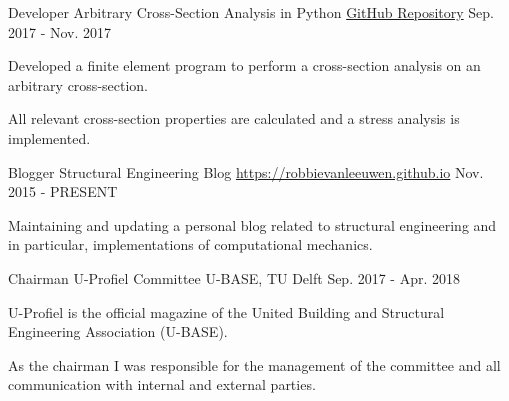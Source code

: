 

\begin{cventries}

  \cventry
    {Developer} %
    {Arbitrary Cross-Section Analysis in Python} %
    {\href{https://github.com/robbievanleeuwen/section-properties}{GitHub Repository}} %
    {Sep. 2017 - Nov. 2017} %
    {
      \begin{cvitems} %
        \item {Developed a finite element program to perform a cross-section analysis on an arbitrary cross-section.}
        \item {All relevant cross-section properties are calculated and a stress analysis is implemented.}
      \end{cvitems}
    }
 
  \cventry
    {Blogger} %
    {Structural Engineering Blog} %
    {\href{https://robbievanleeuwen.github.io}{https://robbievanleeuwen.github.io}} %
    {Nov. 2015 - PRESENT} %
    {
      \begin{cvitems} %
        \item {Maintaining and updating a personal blog related to structural engineering and in particular, implementations of computational mechanics.}
      \end{cvitems}
    }
    
     \cventry
    {Chairman} %
    {U-Profiel Committee} %
    {U-BASE, TU Delft} %
    {Sep. 2017 - Apr. 2018} %
    {
      \begin{cvitems} %
        \item {U-Profiel is the official magazine of the United Building and Structural Engineering Association (U-BASE).}
        \item {As the chairman I was responsible for the management of the committee and all communication with internal and external parties.}
      \end{cvitems}
    }

\end{cventries}
